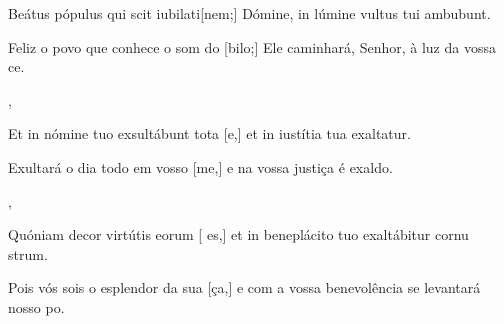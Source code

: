 {    {\item {}Beátus pópulus qui scit iubilati[nem;] Dómine, in lúmine vultus tui ambubunt.~\Responsorium}%
        {\item Feliz o povo que conhece o som do [bilo;] Ele caminhará, Senhor, à luz da vossa ce.~\Responsorium},
    {\item {}Et in nómine tuo exsultábunt tota [e,] et in iustítia tua exaltatur.~\Responsorium}%
        {\item Exultará o dia todo em vosso [me,] e na vossa justiça é exaldo.~\Responsorium},
    {\item {}Quóniam decor virtútis eorum [ es,] et in beneplácito tuo exaltábitur cornu strum.~\Responsorium}%
        {\item Pois vós sois o esplendor da sua [ça,] e com a vossa benevolência se levantará nosso po.~\Responsorium}
}